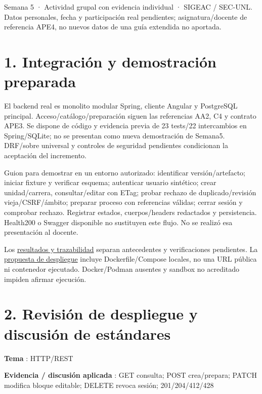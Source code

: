 \documentclass[12pt,a4paper]{report}
\begin{document}

Semana 5 · Actividad grupal con evidencia individual · SIGEAC / SEC-UNL.
Datos personales, fecha y participación real pendientes;
asignatura/docente de referencia APE4, no nuevos datos de una guía
extendida no aportada.

\chapter{1. Integración y demostración
preparada}\label{ACD5-semana-5-1-integraciuxf3n-y-demostraciuxf3n-preparada}

El backend real es monolito modular Spring, cliente Angular y PostgreSQL
principal. Acceso/catálogo/preparación siguen las referencias AA2, C4 y
contrato APE3. Se dispone de código y evidencia previa de 23 tests/22
intercambios en Spring/SQLite; no se presentan como nueva demostración
de Semana5. DRF/sobre universal y controles de seguridad pendientes
condicionan la aceptación del incremento.

Guion para demostrar en un entorno autorizado: identificar
versión/artefacto; iniciar fixture y verificar esquema; autenticar
usuario sintético; crear unidad/carrera, consultar/editar con ETag;
probar rechazo de duplicado/revisión vieja/CSRF/ámbito; preparar proceso
con referencias válidas; cerrar sesión y comprobar rechazo. Registrar
estados, cuerpos/headers redactados y persistencia. Health200 o Swagger
disponible no sustituyen este flujo. No se realizó esa presentación al
docente.

Los \href{../soporte-semanas-4-5/HALLAZGOS_Y_TRAZABILIDAD.md}{resultados
y trazabilidad} separan antecedentes y verificaciones pendientes. La
\href{../APE5-semana-5/INSTRUCCIONES_DESPLIEGUE.md}{propuesta de
despliegue} incluye Dockerfile/Compose locales, no una URL pública ni
contenedor ejecutado. Docker/Podman ausentes y sandbox no acreditado
impiden afirmar ejecución.

\chapter{2. Revisión de despliegue y discusión de
estándares}\label{ACD5-semana-5-2-revisiuxf3n-de-despliegue-y-discusiuxf3n-de-estuxe1ndares}

\textbf{Tema }: HTTP/REST

\textbf{Evidencia / discusión aplicada }: GET consulta; POST
crea/prepara; PATCH modifica bloque editable; DELETE revoca sesión;
201/204/412/428
\end{document}
